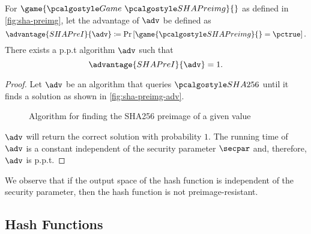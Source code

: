 \begin{proposition}
 For $\game{\Game~\algo{SHAPreimg}}{}$ as defined in \autoref{fig:sha-preimg}, let the advantage of $\adv$ be defined as
 \[
  \advantage{SHAPreI}{\adv} \defeq \pr{\game{\algo{SHAPreimg}}{} = \pctrue}.
 \]
 There exists a p.p.t algorithm $\adv$ such that
 \[
 \advantage{SHAPreI}{\adv} = 1.
 \]
\end{proposition}

\begin{proof}
  Let $\adv$ be an algorithm that queries $\algo{SHA256}$ until it finds a solution as shown in \autoref{fig:sha-preimg-adv}.
  \begin{figure}[tbhp]
  \begin{center}
    \begin{tcolorbox}[width=5cm]
      \begin{pchstack}[center]
      \end{pchstack}
    \end{tcolorbox}
  \end{center}
  \caption{Algorithm for finding the SHA256 preimage of a given value \label{fig:sha-preimg-adv}}
  \end{figure}
  $\adv$ will return the correct solution with probability $1$.
  The running time of $\adv$ is a constant independent of the security parameter $\secpar$ and, therefore, $\adv$ is p.p.t.
\end{proof}


We observe that if the output space of the hash function is independent of the security parameter, then the hash function is not preimage-resistant.

\subsection{Hash Functions}

